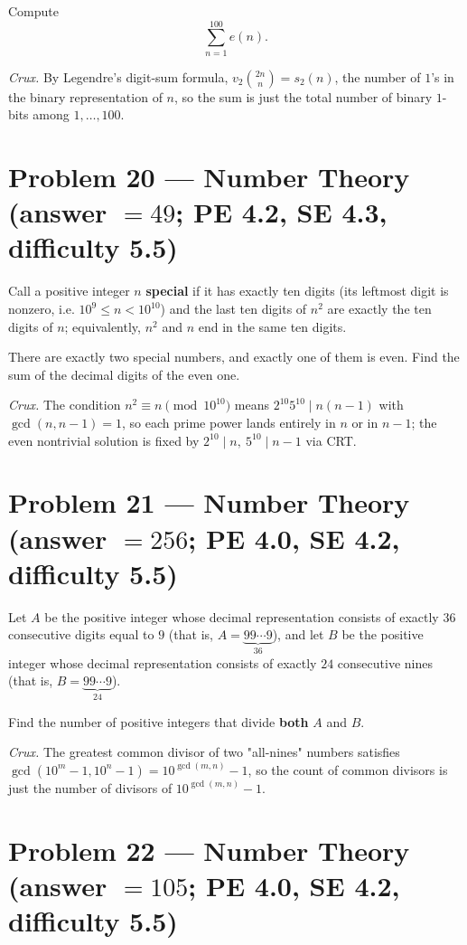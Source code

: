 \documentclass[11pt]{article}
\begin{document}
Compute
\[
\sum_{n=1}^{100} e(n).
\]

\medskip

\textit{Crux.} By Legendre's digit-sum formula, $v_2\!\binom{2n}{n}=s_2(n)$, the number of $1$'s in the binary representation of $n$, so the sum is just the total number of binary $1$-bits among $1,\dots,100$.

\section*{Problem 20 --- Number Theory \quad (answer $=49$; PE 4.2, SE 4.3, difficulty 5.5)}

Call a positive integer $n$ \textbf{special} if it has exactly ten digits (its leftmost digit is nonzero, i.e. $10^{9}\le n<10^{10}$) and the last ten digits of $n^{2}$ are exactly the ten digits of $n$; equivalently, $n^{2}$ and $n$ end in the same ten digits.

There are exactly two special numbers, and exactly one of them is even. Find the sum of the decimal digits of the even one.

\medskip

\textit{Crux.} The condition $n^2\equiv n \pmod{10^{10}}$ means $2^{10}5^{10}\mid n(n-1)$ with $\gcd(n,n-1)=1$, so each prime power lands entirely in $n$ or in $n-1$; the even nontrivial solution is fixed by $2^{10}\mid n,\ 5^{10}\mid n-1$ via CRT.

\section*{Problem 21 --- Number Theory \quad (answer $=256$; PE 4.0, SE 4.2, difficulty 5.5)}

Let $A$ be the positive integer whose decimal representation consists of exactly $36$ consecutive digits equal to $9$ (that is, $A=\underbrace{99\cdots9}_{36}$), and let $B$ be the positive integer whose decimal representation consists of exactly $24$ consecutive nines (that is, $B=\underbrace{99\cdots9}_{24}$).

Find the number of positive integers that divide \textbf{both} $A$ and $B$.

\medskip

\textit{Crux.} The greatest common divisor of two "all-nines" numbers satisfies $\gcd(10^m-1,10^n-1)=10^{\gcd(m,n)}-1$, so the count of common divisors is just the number of divisors of $10^{\gcd(m,n)}-1$.

\section*{Problem 22 --- Number Theory \quad (answer $=105$; PE 4.0, SE 4.2, difficulty 5.5)}
\end{document}
